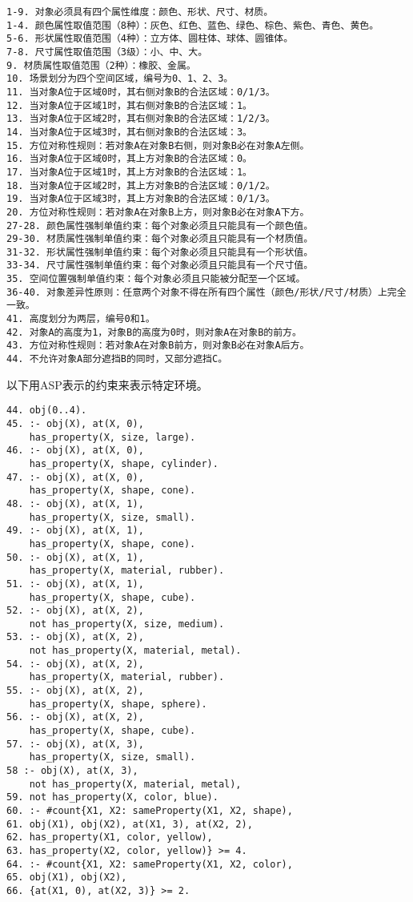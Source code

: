 \begin{lstlisting}
1-9. 对象必须具有四个属性维度：颜色、形状、尺寸、材质。
1-4. 颜色属性取值范围（8种）：灰色、红色、蓝色、绿色、棕色、紫色、青色、黄色。
5-6. 形状属性取值范围（4种）：立方体、圆柱体、球体、圆锥体。
7-8. 尺寸属性取值范围（3级）：小、中、大。
9. 材质属性取值范围（2种）：橡胶、金属。
10. 场景划分为四个空间区域，编号为0、1、2、3。
11. 当对象A位于区域0时，其右侧对象B的合法区域：0/1/3。
12. 当对象A位于区域1时，其右侧对象B的合法区域：1。
13. 当对象A位于区域2时，其右侧对象B的合法区域：1/2/3。
14. 当对象A位于区域3时，其右侧对象B的合法区域：3。
15. 方位对称性规则：若对象A在对象B右侧，则对象B必在对象A左侧。
16. 当对象A位于区域0时，其上方对象B的合法区域：0。
17. 当对象A位于区域1时，其上方对象B的合法区域：1。
18. 当对象A位于区域2时，其上方对象B的合法区域：0/1/2。
19. 当对象A位于区域3时，其上方对象B的合法区域：0/1/3。
20. 方位对称性规则：若对象A在对象B上方，则对象B必在对象A下方。
27-28. 颜色属性强制单值约束：每个对象必须且只能具有一个颜色值。
29-30. 材质属性强制单值约束：每个对象必须且只能具有一个材质值。
31-32. 形状属性强制单值约束：每个对象必须且只能具有一个形状值。
33-34. 尺寸属性强制单值约束：每个对象必须且只能具有一个尺寸值。
35. 空间位置强制单值约束：每个对象必须且只能被分配至一个区域。
36-40. 对象差异性原则：任意两个对象不得在所有四个属性（颜色/形状/尺寸/材质）上完全一致。
41. 高度划分为两层，编号0和1。
42. 对象A的高度为1，对象B的高度为0时，则对象A在对象B的前方。
43. 方位对称性规则：若对象A在对象B前方，则对象B必在对象A后方。
44. 不允许对象A部分遮挡B的同时，又部分遮挡C。
\end{lstlisting}
以下用ASP表示的约束来表示特定环境。
\begin{lstlisting}
44. obj(0..4).
45. :- obj(X), at(X, 0),
    has_property(X, size, large).
46. :- obj(X), at(X, 0),
    has_property(X, shape, cylinder).
47. :- obj(X), at(X, 0),
    has_property(X, shape, cone).
48. :- obj(X), at(X, 1),
    has_property(X, size, small).
49. :- obj(X), at(X, 1),
    has_property(X, shape, cone).
50. :- obj(X), at(X, 1),
    has_property(X, material, rubber).
51. :- obj(X), at(X, 1),
    has_property(X, shape, cube).
52. :- obj(X), at(X, 2),
    not has_property(X, size, medium).
53. :- obj(X), at(X, 2),
    not has_property(X, material, metal).
54. :- obj(X), at(X, 2),
    has_property(X, material, rubber).
55. :- obj(X), at(X, 2),
    has_property(X, shape, sphere).
56. :- obj(X), at(X, 2),
    has_property(X, shape, cube).
57. :- obj(X), at(X, 3),
    has_property(X, size, small).
58 :- obj(X), at(X, 3),
    not has_property(X, material, metal),
59. not has_property(X, color, blue).
60. :- #count{X1, X2: sameProperty(X1, X2, shape),
61. obj(X1), obj(X2), at(X1, 3), at(X2, 2),
62. has_property(X1, color, yellow),
63. has_property(X2, color, yellow)} >= 4.
64. :- #count{X1, X2: sameProperty(X1, X2, color),
65. obj(X1), obj(X2),
66. {at(X1, 0), at(X2, 3)} >= 2.
\end{lstlisting}
